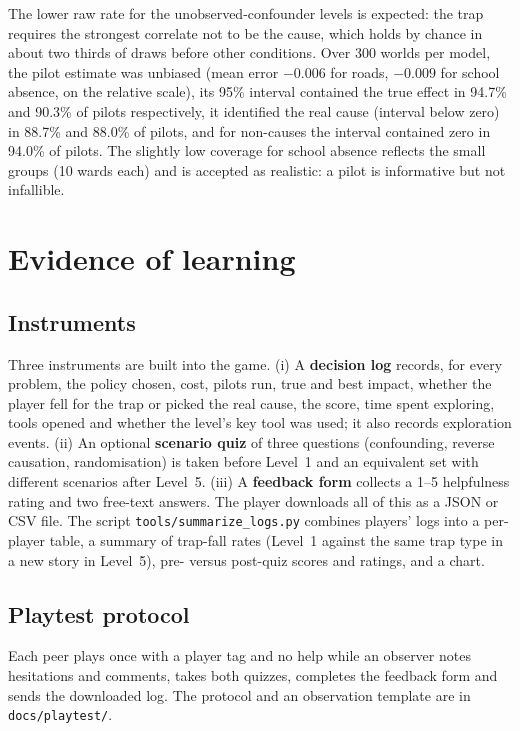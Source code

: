 \documentclass[11pt,a4paper]{article}
\begin{document}
\noindent The lower raw rate for the unobserved-confounder levels is expected: the trap requires the strongest correlate not
to be the cause, which holds by chance in about two thirds of draws before other conditions. Over 300 worlds per model,
the pilot estimate was unbiased (mean error $-0.006$ for roads, $-0.009$ for school absence, on the relative scale), its 95\%
interval contained the true effect in 94.7\% and 90.3\% of pilots respectively, it identified the real cause (interval below
zero) in 88.7\% and 88.0\% of pilots, and for non-causes the interval contained zero in 94.0\% of pilots. The slightly low
coverage for school absence reflects the small groups (10 wards each) and is accepted as realistic: a pilot is informative
but not infallible.

\section{Evidence of learning}
\subsection{Instruments}
Three instruments are built into the game. (i) A \textbf{decision log} records, for every problem, the policy chosen, cost,
pilots run, true and best impact, whether the player fell for the trap or picked the real cause, the score, time spent
exploring, tools opened and whether the level's key tool was used; it also records exploration events. (ii) An optional
\textbf{scenario quiz} of three questions (confounding, reverse causation, randomisation) is taken before Level~1 and an
equivalent set with different scenarios after Level~5. (iii) A \textbf{feedback form} collects a 1--5 helpfulness rating and
two free-text answers. The player downloads all of this as a JSON or CSV file. The script \texttt{tools/summarize\_logs.py}
combines players' logs into a per-player table, a summary of trap-fall rates (Level~1 against the same trap type in a new
story in Level~5), pre- versus post-quiz scores and ratings, and a chart.

\subsection{Playtest protocol}
Each peer plays once with a player tag and no help while an observer notes hesitations and comments, takes both quizzes,
completes the feedback form and sends the downloaded log. The protocol and an observation template are in
\texttt{docs/playtest/}.
\end{document}
